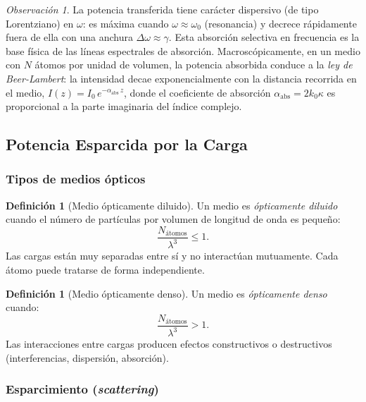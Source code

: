 \documentclass[12pt, a4paper]{article}
\theoremstyle{plain}
\theoremstyle{definition}
\newtheorem{definicion}[teorema]{Definición}
\theoremstyle{remark}
\newtheorem*{observacion}{Observación}
\begin{document}
\begin{observacion}
La potencia transferida tiene carácter dispersivo (de tipo Lorentziano) en
$\omega$: es máxima cuando $\omega\approx\omega_0$ (resonancia) y decrece
rápidamente fuera de ella con una anchura $\Delta\omega \approx \gamma$. Esta
absorción selectiva en frecuencia es la base física de las líneas espectrales
de absorción. Macroscópicamente, en un medio con $N$ átomos por unidad de
volumen, la potencia absorbida conduce a la \emph{ley de Beer-Lambert}: la
intensidad decae exponencialmente con la distancia recorrida en el medio,
$I(z) = I_0\,e^{-\alpha_\text{abs}\,z}$, donde el coeficiente de absorción
$\alpha_\text{abs} = 2k_0\kappa$ es proporcional a la parte imaginaria del
índice complejo.
\end{observacion}

\subsection{Potencia Esparcida por la Carga}

\subsubsection{Tipos de medios ópticos}

\begin{definicion}[Medio ópticamente diluido]
Un medio es \emph{ópticamente diluido} cuando el número de partículas por
volumen de longitud de onda es pequeño:
\[
  \frac{N_\text{átomos}}{\lambda^3} \leq 1.
\]
Las cargas están muy separadas entre sí y no interactúan mutuamente. Cada
átomo puede tratarse de forma independiente.
\end{definicion}

\begin{definicion}[Medio ópticamente denso]
Un medio es \emph{ópticamente denso} cuando:
\[
  \frac{N_\text{átomos}}{\lambda^3} > 1.
\]
Las interacciones entre cargas producen efectos constructivos o destructivos
(interferencias, dispersión, absorción).
\end{definicion}

\subsubsection{Esparcimiento (\emph{scattering})}
\end{document}
